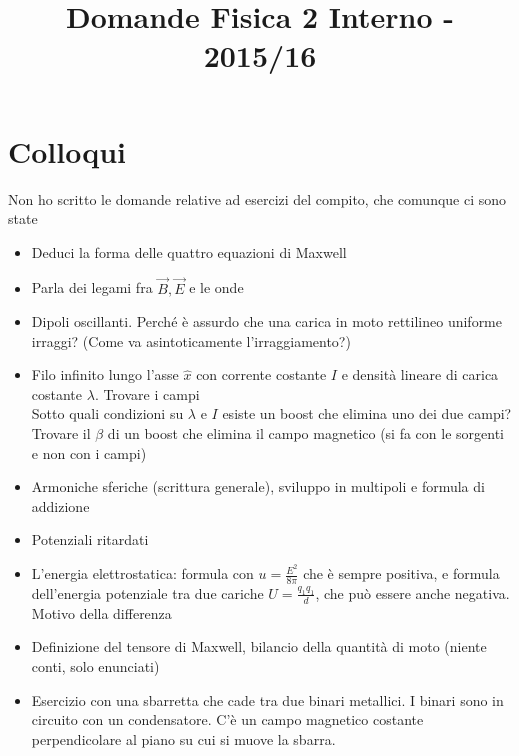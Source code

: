 \documentclass[a4paper,NoNotes,GeneralMath]{stdmdoc}
\begin{document}
	\title{Domande Fisica 2 Interno - 2015/16}
	
	\section*{Colloqui}
	Non ho scritto le domande relative ad esercizi del compito, che comunque ci sono state
	\begin{itemize}
		\item Deduci la forma delle quattro equazioni di Maxwell
		\item Parla dei legami fra $\vec{B}, \vec{E}$ e le onde
		\item Dipoli oscillanti. Perché è assurdo che una carica in moto rettilineo uniforme irraggi? (Come va asintoticamente l'irraggiamento?)
		\item Filo infinito lungo l'asse $\hat{x}$ con corrente costante $I$ e densità lineare di carica costante $\lambda$. Trovare i campi \\
			Sotto quali condizioni su $\lambda$ e $I$ esiste un boost che elimina uno dei due campi? Trovare il $\beta$ di un boost che elimina il campo magnetico (si fa con le sorgenti e non con i campi)
		\item Armoniche sferiche (scrittura generale), sviluppo in multipoli e formula di addizione
		\item Potenziali ritardati
		\item L'energia elettrostatica: formula con $u = \frac{E^2}{8\pi }$ che è sempre positiva, e formula dell'energia potenziale tra due cariche $U = \frac{q_1 q_1}{d}$, che può essere anche negativa. Motivo della differenza
		\item Definizione del tensore di Maxwell, bilancio della quantità di moto (niente conti, solo enunciati)
		\item Esercizio con una sbarretta che cade tra due binari metallici. I binari sono in circuito con un condensatore. C'è un campo magnetico costante perpendicolare al piano su cui si muove la sbarra.
	\end{itemize}
\end{document}
